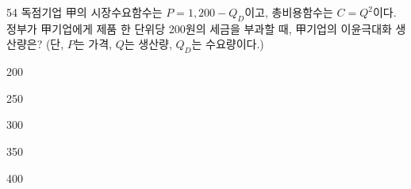 \begin{question}{54}
독점기업 甲의 시장수요함수는 $P=1{,}200-Q_{D}$이고, 총비용함수는 $C=Q^{2}$이다. 정부가 甲기업에게 제품 한 단위당 200원의 세금을 부과할 때, 甲기업의 이윤극대화 생산량은? (단, $P$는 가격, $Q$는 생산량, $Q_{D}$는 수요량이다.)
\begin{choices}
  \item 200
  \item 250
  \item 300
  \item 350
  \item 400
\end{choices}
\end{question}
